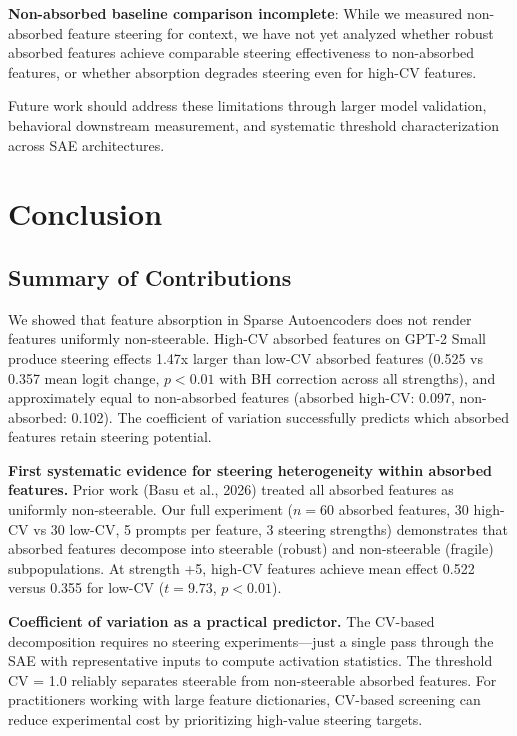 \documentclass{article}
\begin{document}
\textbf{Non-absorbed baseline comparison incomplete}: While we measured non-absorbed feature steering for context, we have not yet analyzed whether robust absorbed features achieve comparable steering effectiveness to non-absorbed features, or whether absorption degrades steering even for high-CV features.

Future work should address these limitations through larger model validation, behavioral downstream measurement, and systematic threshold characterization across SAE architectures.

\section{Conclusion}

\subsection{Summary of Contributions}

We showed that feature absorption in Sparse Autoencoders does not render features uniformly non-steerable. High-CV absorbed features on GPT-2 Small produce steering effects 1.47x larger than low-CV absorbed features (0.525 vs 0.357 mean logit change, $p < 0.01$ with BH correction across all strengths), and approximately equal to non-absorbed features (absorbed high-CV: 0.097, non-absorbed: 0.102). The coefficient of variation successfully predicts which absorbed features retain steering potential.

\textbf{First systematic evidence for steering heterogeneity within absorbed features.} Prior work (Basu et al., 2026) treated all absorbed features as uniformly non-steerable. Our full experiment ($n=60$ absorbed features, 30 high-CV vs 30 low-CV, 5 prompts per feature, 3 steering strengths) demonstrates that absorbed features decompose into steerable (robust) and non-steerable (fragile) subpopulations. At strength +5, high-CV features achieve mean effect 0.522 versus 0.355 for low-CV ($t = 9.73$, $p < 0.01$).

\textbf{Coefficient of variation as a practical predictor.} The CV-based decomposition requires no steering experiments---just a single pass through the SAE with representative inputs to compute activation statistics. The threshold CV = 1.0 reliably separates steerable from non-steerable absorbed features. For practitioners working with large feature dictionaries, CV-based screening can reduce experimental cost by prioritizing high-value steering targets.
\end{document}
